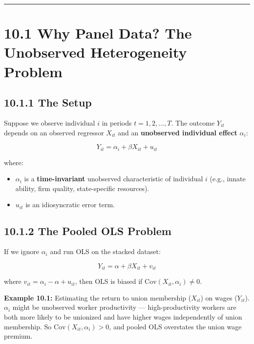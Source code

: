 \medskip\hrule\medskip

\section{10.1 Why Panel Data? The Unobserved Heterogeneity Problem}

\subsection{10.1.1 The Setup}

Suppose we observe individual $i$ in periods $t = 1, 2, \ldots, T$. The outcome $Y_{it}$ depends on an observed regressor $X_{it}$ and an \textbf{unobserved individual effect} $\alpha_i$:

\[
Y_{it} = \alpha_i + \beta X_{it} + u_{it} \tag{10.1}
\]

where:
\begin{itemize}
\item $\alpha_i$ is a \textbf{time-invariant} unobserved characteristic of individual $i$ (e.g., innate ability, firm quality, state-specific resources).
\item $u_{it}$ is an idiosyncratic error term.
\end{itemize}

\subsection{10.1.2 The Pooled OLS Problem}

If we ignore $\alpha_i$ and run OLS on the stacked dataset:

\[
Y_{it} = \alpha + \beta X_{it} + v_{it}
\]

where $v_{it} = \alpha_i - \alpha + u_{it}$, then OLS is biased if $\text{Cov}(X_{it}, \alpha_i) \neq 0$.

\textbf{Example 10.1:} Estimating the return to union membership ($X_{it}$) on wages ($Y_{it}$). $\alpha_i$ might be unobserved worker productivity --- high-productivity workers are both more likely to be unionized and have higher wages independently of union membership. So $\text{Cov}(X_{it}, \alpha_i) > 0$, and pooled OLS overstates the union wage premium.

